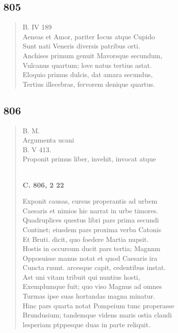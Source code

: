 \documentclass[11pt, a4paper]{report}
\begin{document}
            \subsection*{805}
      \begin{verse}
      B. IV 189 \\ Aeneas et Amor, pariter Iocus atque Cupido \\ Sunt nati Veneris diversis patribus orti. \\ Anchises primum genuit Mavorsque secundum, \\ Vulcanus quartum; love natus tertius astat. \\ Eloquio primus dulcis, dat amara secundus, \\ Tertius illecebras, fervorem denique quartus. \\ 
      \end{verse}
  
            \subsection*{806}
      \begin{verse}
      B. M. \\ Argumenta ucani \\ B. V 413. \\ Proponit primus liber, invehit, invocat atque \\ 
        ﻿\pagebreak 
     \marginpar{[279]} \begin{center} \textbf{C. 806, 2 22} \end{center}Exponit causas, cursus properantis ad urbem \\ Caesaris et nimios hic narrat in urbe timores. \\ Quadruplices questus libri pars prima secundi \\ Continet; eiusdem pars proxima verba Catonis \\ Et Bruti. dicit, quo foedere Martia nupsit. \\ Hostis in occursum ducit pars tertia; Magnnm \\ Opposuisse manus notat et quod Caesaris ira \\ Cuncta ruunt. arcesque capit, cedentibus instat. \\ Ast uni vitam tribuit qui nuntius hosti, \\ Exemplumque fuit; quo viso Magnus ad omnes \\ Turmas ipse suas hortandas magna minatur. \\ Hinc pars quarta notat Pompeium tunc properasse \\ Brundusium; tandemque videns maris ostia claudi \\ lesperiam ptppesque duas in parte reliquit. \\ 
      \end{verse}
  
\end{document}
